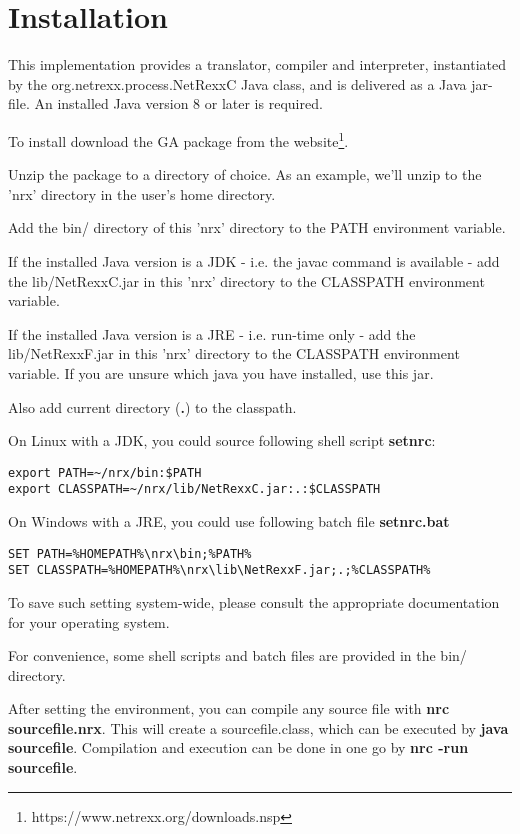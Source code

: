 \section{Installation}
This \nr{} implementation provides a translator, compiler and interpreter, instantiated by the 
org.netrexx.process.NetRexxC Java class, and is delivered as a Java jar-file. An installed Java version 8 or later is required.

To install \nr{} download the GA package from the \nr{} website\footnote{https://www.netrexx.org/downloads.nsp}.

Unzip the package to a directory of choice. As an example, we'll unzip to the 'nrx' directory in the user's home directory.

Add the bin/ directory of this 'nrx' directory to the PATH environment variable.

If the installed Java version is a JDK - i.e. the javac command is available - add the lib/NetRexxC.jar in this 'nrx' directory to the CLASSPATH environment variable.

If the installed Java version is a JRE - i.e. run-time only - add the lib/NetRexxF.jar in this 'nrx' directory to the CLASSPATH environment variable. If you are unsure which java you have installed, use this jar.

Also add current directory (\textbf{.}) to the classpath.

On Linux with a JDK, you could source following shell script \textbf{setnrc}:

\begin{lstlisting}
export PATH=~/nrx/bin:$PATH
export CLASSPATH=~/nrx/lib/NetRexxC.jar:.:$CLASSPATH
\end{lstlisting}

On Windows with a JRE, you could use following batch file \textbf{setnrc.bat}

\begin{lstlisting}
SET PATH=%HOMEPATH%\nrx\bin;%PATH%
SET CLASSPATH=%HOMEPATH%\nrx\lib\NetRexxF.jar;.;%CLASSPATH%
\end{lstlisting}

To save such setting system-wide, please consult the appropriate documentation for your operating system.


For convenience, some shell scripts and batch files are provided in the bin/ directory.

After setting the environment, you can compile any \nr{} source file with \textbf{nrc sourcefile.nrx}. This will create a sourcefile.class, which can be executed by \textbf{java sourcefile}.
Compilation and execution can be done in one go by \textbf{nrc -run sourcefile}.

